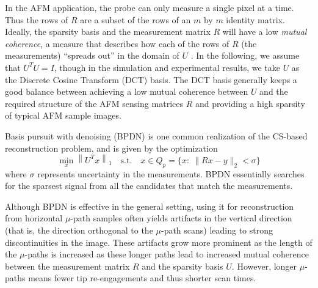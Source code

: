 \documentclass[twocolumn,oneside]{IEEEtran/IEEEtran}
\begin{document}
	
In the AFM application, the probe can only measure a single pixel at a time.
Thus the rows of $R$ are a subset of the rows of an $m$ by $m$ identity matrix.
Ideally, the sparsity basis and
the measurement matrix $R$ will have a low \textit{mutual coherence}, a
measure that describes how each of the rows of $R$ (the measurements)
``spreads out'' in the domain of $U$ \cite{candes2007sparsity}.
In the following, we assume that $U^TU=I$, though in the simulation and
experimental results, we take $U$ as the Discrete Cosine Transform (DCT) basis.
The DCT basis generally keeps a good balance between achieving a low
mutual coherence between $U$ and the required structure of the AFM sensing
matrices $R$ and providing a high sparsity of typical AFM sample images. 
	
Basis pursuit with denoising (BPDN) is one common realization of the CS-based
reconstruction problem, and is given by the optimization
\begin{equation}
  \min_{x} \left \| U^Tx \right \|_1 \quad
  \text{s.t.}\quad x\in Q_p = \{x:~\|Rx - y\|_2 < \sigma\} \label{op:bp}
\end{equation}
where $\sigma$ represents uncertainty in the measurements. BPDN
essentially searches for the sparsest signal from all
the candidates that match the measurements.

Although BPDN is effective in the general setting, using it for reconstruction
from horizontal $\mu$-path samples often yields artifacts in the vertical
direction (that is, the direction orthogonal to the $\mu$-path scans) leading to
strong discontinuities in the image. These artifacts grow more prominent as the
length of the $\mu$-paths is increased \cite{maxwell2014compressed} as these
longer paths lead to increased mutual coherence between the measurement matrix
$R$ and the sparsity basis $U$. However, longer $\mu$-paths means fewer
tip re-engagements and thus shorter scan times.
\end{document}

